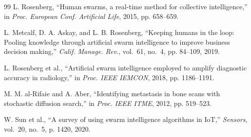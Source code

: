 \documentclass[journal,twoside]{IEEEtran}
\begin{document}
\begin{thebibliography}{99}
L. Rosenberg, ``Human swarms, a real-time method for collective intelligence,'' in \emph{Proc. European Conf. Artificial Life}, 2015, pp. 658--659.

L. Metcalf, D. A. Askay, and L. B. Rosenberg, ``Keeping humans in the loop: Pooling knowledge through artificial swarm intelligence to improve business decision making,'' \emph{Calif. Manage. Rev.}, vol.~61, no.~4, pp. 84--109, 2019.

L. Rosenberg et al., ``Artificial swarm intelligence employed to amplify diagnostic accuracy in radiology,'' in \emph{Proc. IEEE IEMCON}, 2018, pp. 1186--1191.

M. M. al-Rifaie and A. Aber, ``Identifying metastasis in bone scans with stochastic diffusion search,'' in \emph{Proc. IEEE ITME}, 2012, pp. 519--523.

W. Sun et al., ``A survey of using swarm intelligence algorithms in {IoT},'' \emph{Sensors}, vol.~20, no.~5, p. 1420, 2020.

\end{thebibliography}
\end{document}
